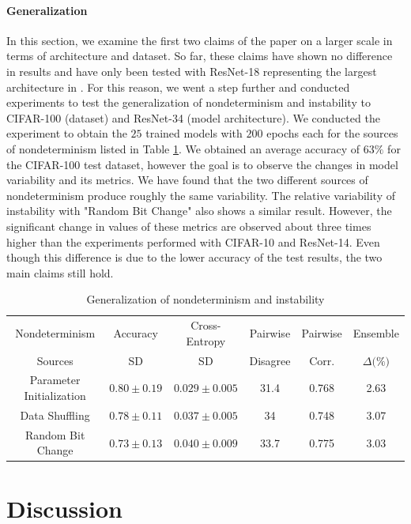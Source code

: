 \paragraph{Generalization}
In this section, we examine the first two claims of the paper on a larger scale in terms of architecture and dataset. So far, these claims have shown no difference in results and have only been tested with ResNet-18 representing the largest architecture in \cite{summers2021nondeterminism}. For this reason, we went a step further and conducted experiments to test the generalization of nondeterminism and instability to CIFAR-100 (dataset) and ResNet-34 (model architecture). We conducted the experiment to obtain the $25$ trained models with $200$ epochs each for the sources of nondeterminism listed in Table \ref{table:table10}. We obtained an average accuracy of $63\%$ for the CIFAR-100 test dataset, however the goal is to observe the changes in model variability and its metrics.  We have found that the two different sources of nondeterminism produce roughly the same variability. The relative variability of instability with "Random Bit Change" also shows a similar result. However, the significant change in values of these metrics are observed about three times higher than the experiments performed with CIFAR-10 and ResNet-14. Even though this difference is due to the lower accuracy of the test results, the two main claims still hold.

\begin{table}[!htb]
\centering
	\begin{tabular}{c|c|c|c|c|c}
	\hline
    Nondeterminism  & Accuracy & Cross-Entropy & Pairwise  & Pairwise & Ensemble \\
    Sources & SD \text{(\%)} & SD \text{(\%)} & Disagree \text{(\%)} & Corr. & $\Delta \text{(\%)}$\\
	\hline
		Parameter Initialization & $0.80 \pm 0.19$  & $0.029 \pm 0.005$  &  31.4 & 0.768 & 2.63  \\
	    Data Shuffling & $0.78 \pm 0.11$ & $0.037 \pm 0.005$  &  34 & 0.748 & 3.07   \\
	\hline    
	    Random Bit Change & $0.73 \pm 0.13$ & $0.040 \pm 0.009$  &  33.7 & 0.775 & 3.03 \\
		\hline
	\end{tabular}
	\caption{Generalization of nondeterminism and instability}
	\label{table:table10}
\end{table}
\section{Discussion}
\label{sec:Discussion}


